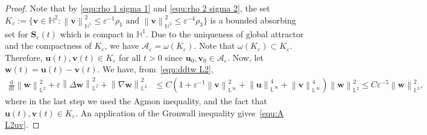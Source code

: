 \documentclass[11pt, reqno]{amsart}
\theoremstyle{definition}
\numberwithin{equation}{section}
\newcommand{\bff}{\boldsymbol}
\newcommand{\bb}{\mathbb}
\newcommand{\ddt}{\frac{\mathrm{d}}{\mathrm{d}t}}
\newcommand{\norm}[2]{\left\|{#1}\right\|_{#2}}
\begin{document}
\begin{proof}
Note that by \eqref{equ:rho 1 sigma 1} and \eqref{equ:rho 2 sigma 2}, the set $K_\varepsilon:=\{\bff{v}\in \bb{H}^2: \norm{\bff{v}}{\bb{H}^1}^2 \leq \varepsilon^{-1} \rho_1 \text{ and } \norm{\bff{v}}{\bb{H}^2}^2 \leq \varepsilon^{-4} \rho_3\}$ is a bounded absorbing set for $\bff{S}_\varepsilon(t)$ which is compact in $\bb{H}^1$. Due to the uniqueness of global attractor and the compactness of $K_\varepsilon$, we have $\mathcal{A_\varepsilon}= \omega(K_\varepsilon)$. Note that $\omega(K_\varepsilon)\subset K_\varepsilon$. Therefore, $\bff{u}(t),\bff{v}(t)\in K_\varepsilon$ for all $t>0$ since $\bff{u}_0,\bff{v}_0\in \mathcal{A}_\varepsilon$.
Now, let $\bff{w}(t)=\bff{u}(t)-\bff{v}(t)$. We have, from~\eqref{equ:ddtw L2},
\begin{align*}
    \ddt \norm{\bff{w}}{\bb{L}^2}^2
    +
    \varepsilon \norm{\Delta \bff{w}}{\bb{L}^2}^2
    +
    \norm{\nabla \bff{w}}{\bb{L}^2}^2
    &\leq
    C \left(1+ \varepsilon^{-1} \norm{\bff{v}}{\bb{L}^\infty}^2 + \norm{\bff{u}}{\bb{L}^\infty}^4 + \norm{\bff{v}}{\bb{L}^\infty}^4 \right) \norm{\bff{w}}{\bb{L}^2}^2
    \leq
    C\varepsilon^{-5} \norm{\bff{w}}{\bb{L}^2}^2,
\end{align*}
where in the last step we used the Agmon inequality, and the fact that $\bff{u}(t),\bff{v}(t)\in K_\varepsilon$. An application of the Gronwall inequality gives~\eqref{equ:A L2uv}.


\end{proof}
\end{document}
